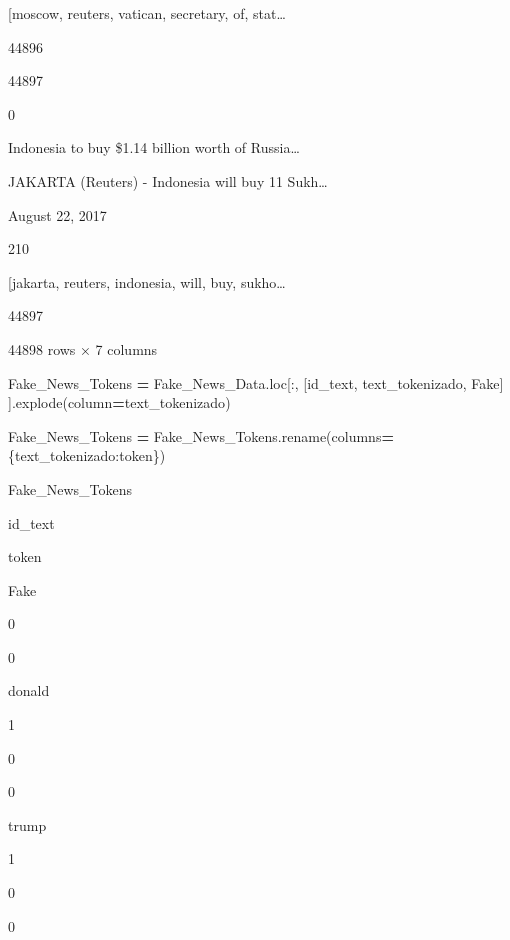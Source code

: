 \documentclass[
  11pt,
  a4paper,
]{article}
\newenvironment{Shaded}{\begin{snugshade}}{\end{snugshade}}
\newcommand{\NormalTok}[1]{#1}
\newcommand{\OperatorTok}[1]{\textcolor[rgb]{0.81,0.36,0.00}{\textbf{#1}}}
\newcommand{\StringTok}[1]{\textcolor[rgb]{0.31,0.60,0.02}{#1}}
\begin{document}
{[}moscow, reuters, vatican, secretary, of, stat\ldots{}

44896

44897

0

Indonesia to buy \$1.14 billion worth of Russia\ldots{}

JAKARTA (Reuters) - Indonesia will buy 11 Sukh\ldots{}

August 22, 2017

210

{[}jakarta, reuters, indonesia, will, buy, sukho\ldots{}

44897

44898 rows × 7 columns

\begin{Shaded}
\begin{Highlighting}[]
\NormalTok{Fake\_News\_Tokens }\OperatorTok{=}\NormalTok{ Fake\_News\_Data.loc[:, [}\StringTok{\textquotesingle{}id\_text\textquotesingle{}}\NormalTok{, }\StringTok{\textquotesingle{}text\_tokenizado\textquotesingle{}}\NormalTok{, }\StringTok{\textquotesingle{}Fake\textquotesingle{}}\NormalTok{] ].explode(column}\OperatorTok{=}\StringTok{\textquotesingle{}text\_tokenizado\textquotesingle{}}\NormalTok{)}

\NormalTok{Fake\_News\_Tokens }\OperatorTok{=}\NormalTok{ Fake\_News\_Tokens.rename(columns}\OperatorTok{=}\NormalTok{\{}\StringTok{\textquotesingle{}text\_tokenizado\textquotesingle{}}\NormalTok{:}\StringTok{\textquotesingle{}token\textquotesingle{}}\NormalTok{\})}
\end{Highlighting}
\end{Shaded}

\begin{Shaded}
\begin{Highlighting}[]
\NormalTok{Fake\_News\_Tokens}
\end{Highlighting}
\end{Shaded}

id\_text

token

Fake

0

0

donald

1

0

0

trump

1

0

0
\end{document}
